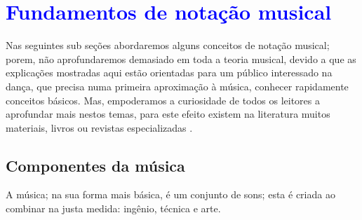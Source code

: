 
\chapter{\textcolor{blue}{Fundamentos de notação musical}}
Nas seguintes sub seções abordaremos alguns conceitos de notação musical;
porem, não aprofundaremos demasiado em toda a teoria musical, 
devido a que as explicações mostradas aqui estão
orientadas para um público interessado na dança, que precisa numa primeira 
aproximação à música, conhecer rapidamente conceitos básicos. 
Mas, empoderamos a curiosidade de todos os leitores a aprofundar mais nestos temas, 
para este efeito existem na literatura muitos materiais, livros ou revistas especializadas 
\cite{medteoria}        %
\cite{cardoso1973curso} %
\cite{mascarenhascurso} %
\cite{grabner2001teoria}%
\cite{alves2004teoria}  %
\cite{apel1969harvard}  %
\cite{azevedocompor}    %
\cite{adolfo2002musica}.%

\section{Componentes da música}

A música; na sua forma mais básica,  é um conjunto de sons; esta é criada ao combinar na justa medida: 
ingênio, técnica e arte.

